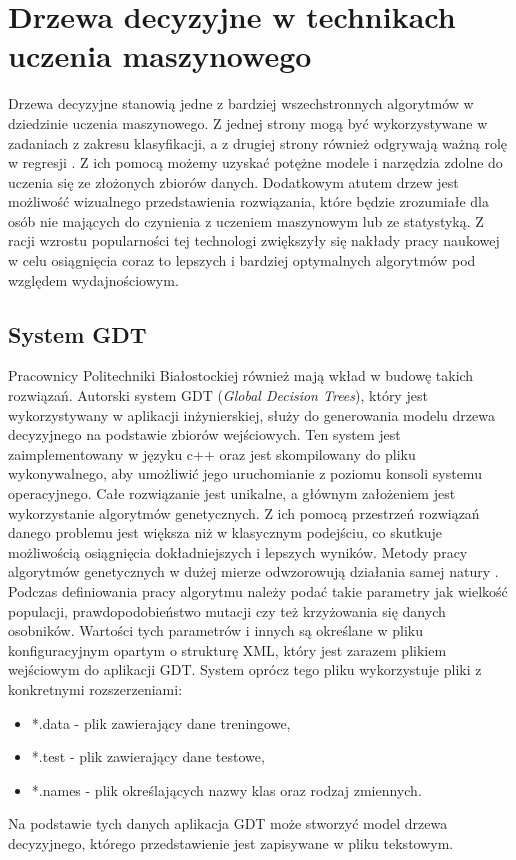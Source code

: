 \section{Drzewa decyzyjne w technikach uczenia maszynowego}

Drzewa decyzyjne stanowią jedne z bardziej wszechstronnych algorytmów w  dziedzinie uczenia maszynowego. Z jednej strony mogą być wykorzystywane w zadaniach z zakresu klasyfikacji, a z drugiej strony również odgrywają ważną rolę w regresji \cite{book_1}. Z ich pomocą możemy uzyskać potężne modele i narzędzia zdolne do uczenia się ze złożonych zbiorów danych. Dodatkowym atutem drzew jest możliwość wizualnego przedstawienia rozwiązania, które będzie zrozumiałe dla osób nie mających do czynienia z uczeniem maszynowym lub ze statystyką. Z racji wzrostu popularności tej technologi zwiększyły się nakłady pracy naukowej w celu osiągnięcia coraz to lepszych i bardziej optymalnych algorytmów pod względem wydajnościowym. 

\subsection{System GDT}
Pracownicy Politechniki Białostockiej również mają wkład w budowę takich rozwiązań. Autorski system GDT (\textit{Global Decision Trees}), który jest wykorzystywany w aplikacji inżynierskiej, służy do generowania modelu drzewa decyzyjnego na podstawie zbiorów wejściowych. Ten system jest zaimplementowany w języku c++ oraz jest skompilowany do pliku wykonywalnego, aby umożliwić jego uruchomianie z poziomu konsoli systemu operacyjnego. Całe rozwiązanie jest unikalne, a głównym założeniem jest wykorzystanie algorytmów genetycznych. Z ich pomocą przestrzeń rozwiązań danego problemu jest większa niż w klasycznym podejściu, co skutkuje możliwością osiągnięcia dokładniejszych i lepszych wyników. Metody pracy algorytmów genetycznych w dużej mierze odwzorowują działania samej natury \cite{book_2}. Podczas definiowania pracy algorytmu należy podać takie parametry jak wielkość populacji, prawdopodobieństwo mutacji czy też krzyżowania się danych osobników. Wartości tych parametrów i innych są określane w pliku konfiguracyjnym opartym o strukturę XML, który jest zarazem plikiem wejściowym do aplikacji GDT. System oprócz tego pliku wykorzystuje pliki z konkretnymi rozszerzeniami:
\begin{itemize}
	\item *.data - plik zawierający dane treningowe, 
	\item *.test - plik zawierający dane testowe,
	\item *.names - plik określających nazwy klas oraz rodzaj zmiennych.
\end{itemize}
Na podstawie tych danych aplikacja GDT może stworzyć model drzewa decyzyjnego, którego przedstawienie jest zapisywane w pliku tekstowym. 


